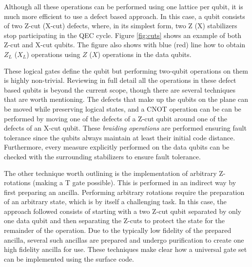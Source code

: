 Although all these operations can be performed using one lattice per qubit,
it is much more efficient to use a defect based approach. In this case, a qubit
consists of two Z-cut (X-cut) defects, where, in its simplest form, two Z (X)
stabilizers stop participating in the QEC cycle. Figure \ref{fig:cuts} shows an
example of both Z-cut and X-cut qubits. The figure also shows with blue
(red) line how to obtain $Z_L$ ($X_L$) operations using $Z$ ($X$) operations in
the data qubits.

These logical gates define the qubit but performing two-qubit operations on them
is highly non-trivial. Reviewing in full detail all the operations in these
defect based qubits is beyond the current scope, though there are several
techniques that are worth mentioning. The defects that make up the qubits on the
plane can be moved while preserving logical states, and a CNOT operation can be
can be performed by moving one of the defects of a Z-cut qubit around one of the
defects of an X-cut qubit. These \textit{ braiding operations } are performed
ensuring fault tolerance since the qubits always maintain at least their initial
code distance. Furthermore, every measure explicitly performed on the data
qubits can be checked with the surrounding stabilizers to ensure fault
tolerance.

The other technique worth outlining is the implementation of arbitrary
Z-rotations (making a T gate possible). This is performed in an indirect way by
first preparing an ancilla. Performing arbitrary rotations require the
preparation of an arbitrary state, which is by itself a challenging task. In
this case, the approach followed consists of starting with a two Z-cut qubit
separated by only one data qubit and then separating the Z-cuts to protect the
state for the remainder of the operation. Due to the typically low fidelity of
the prepared ancilla, several such ancillas are prepared and undergo
purification to create one high fidelity ancilla for use. These techniques make
clear how a universal gate set can be implemented using the surface code.


